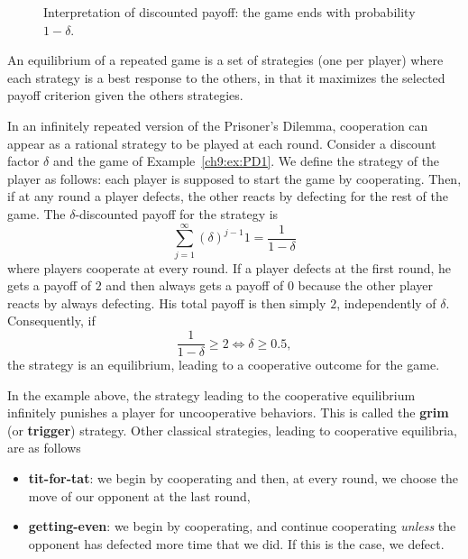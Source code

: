 \begin{figure}
    \centering
    \caption{Interpretation of discounted payoff: the game ends with
    probability $1 - \delta$.}
    \label{fig:infiRepeatedDiscount}
\end{figure}

\begin{definition}
An equilibrium of a repeated game is a set of strategies (one per player)
where each strategy is a best response to the others, in that it maximizes
the selected payoff criterion given the others strategies.
\end{definition}

\begin{example}
\label{ch9:ex:trigger}
In an infinitely repeated version of the Prisoner's Dilemma, cooperation
can appear as a rational strategy to be played at each round.
Consider a discount factor $\delta$ and the game of
Example~\ref{ch9:ex:PD1}.
We define the strategy of the player as follows: each player is supposed
to start the game by cooperating. Then, if at any round a player defects,
the other reacts by defecting for the rest of the game.
The $\delta$-discounted payoff for the strategy is
$$\sum_{j = 1}^{\infty}(\delta)^{j-1} 1 = \frac{1}{1-\delta}$$
where players cooperate at every round.
If a player defects at the first round, he gets a payoff of $2$ and then
always gets a payoff of $0$ because the other player reacts by always
defecting. His total payoff is then simply $2$, independently of $\delta$.
Consequently, if
$$\frac{1}{1-\delta} \geq 2 \Leftrightarrow \delta \geq 0.5,$$
the  strategy is an equilibrium, leading to a cooperative outcome for
the game.
\end{example}

In the example above, the strategy leading to the cooperative equilibrium
infinitely punishes a player for uncooperative behaviors. This is called
the \textbf{grim} (or \textbf{trigger}) strategy. Other classical
strategies, leading to cooperative equilibria, are as follows
\begin{itemize}
    \item \textbf{tit-for-tat}: we begin by cooperating and then, at every
    round, we choose the move of our opponent at the last round,
    \item \textbf{getting-even}: we begin by cooperating, and continue
    cooperating \emph{unless} the opponent has defected more time that
    we did. If this is the case, we defect.
\end{itemize}

